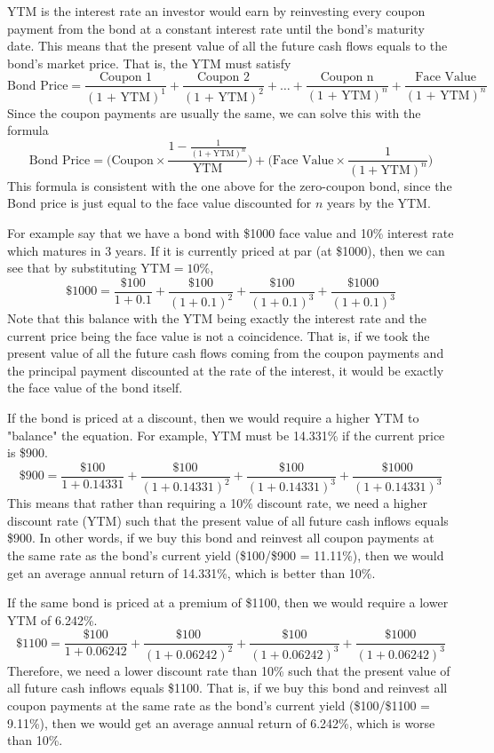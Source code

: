 \documentclass{article}
\begin{document}
    YTM is the interest rate an investor would earn by reinvesting every coupon payment from the bond at a constant interest rate until the bond's maturity date. This means that the present value of all the future cash flows equals to the bond's market price. That is, the YTM must satisfy 
    \[\text{Bond Price} = \frac{\text{Coupon 1}}{(\text{1 + YTM})^1} + \frac{\text{Coupon 2}}{(\text{1 + YTM})^2} + \ldots + \frac{\text{Coupon n}}{(\text{1 + YTM})^n} + \frac{\text{Face Value}}{(\text{1 + YTM})^n}\]
    Since the coupon payments are usually the same, we can solve this with the formula 
    \[\text{Bond Price} = \bigg( \text{Coupon} \times \frac{1 - \frac{1}{(1 + \text{YTM})^n}}{\text{YTM}} \bigg) + \bigg( \text{Face Value} \times \frac{1}{(1 + \text{YTM})^n}\bigg)\]
    This formula is consistent with the one above for the zero-coupon bond, since the Bond price is just equal to the face value discounted for $n$ years by the YTM. 

    For example say that we have a bond with \$1000 face value and 10\% interest rate which matures in 3 years. If it is currently priced at par (at \$1000), then we can see that by substituting YTM$=10\%$, 
    \[\$1000 = \frac{\$100}{1 + 0.1} + \frac{\$100}{(1 + 0.1)^2} + \frac{\$100}{(1 + 0.1)^3} +\frac{\$1000}{(1 + 0.1)^3} \]
    Note that this balance with the YTM being exactly the interest rate and the current price being the face value is not a coincidence. That is, if we took the present value of all the future cash flows coming from the coupon payments and the principal payment discounted at the rate of the interest, it would be exactly the face value of the bond itself. 

    If the bond is priced at a discount, then we would require a higher YTM to "balance" the equation. For example, YTM must be 14.331\% if the current price is \$900. 
    \[\$900 = \frac{\$100}{1 + 0.14331} + \frac{\$100}{(1 + 0.14331)^2} + \frac{\$100}{(1 + 0.14331)^3} +\frac{\$1000}{(1 + 0.14331)^3} \]
    This means that rather than requiring a 10\% discount rate, we need a higher discount rate (YTM) such that the present value of all future cash inflows equals \$900. In other words, if we buy this bond and reinvest all coupon payments at the same rate as the bond's current yield (\$100/\$900 = 11.11\%), then we would get an average annual return of 14.331\%, which is better than 10\%. 

    If the same bond is priced at a premium of \$1100, then we would require a lower YTM of 6.242\%. 
    \[\$1100 = \frac{\$100}{1 + 0.06242} + \frac{\$100}{(1 + 0.06242)^2} + \frac{\$100}{(1 + 0.06242)^3} +\frac{\$1000}{(1 + 0.06242)^3}\]
    Therefore, we need a lower discount rate than 10\% such that the present value of all future cash inflows equals \$1100. That is, if we buy this bond and reinvest all coupon payments at the same rate as the bond's current yield (\$100/\$1100 = 9.11\%), then we would get an average annual return of 6.242\%, which is worse than 10\%. 
\end{document}
